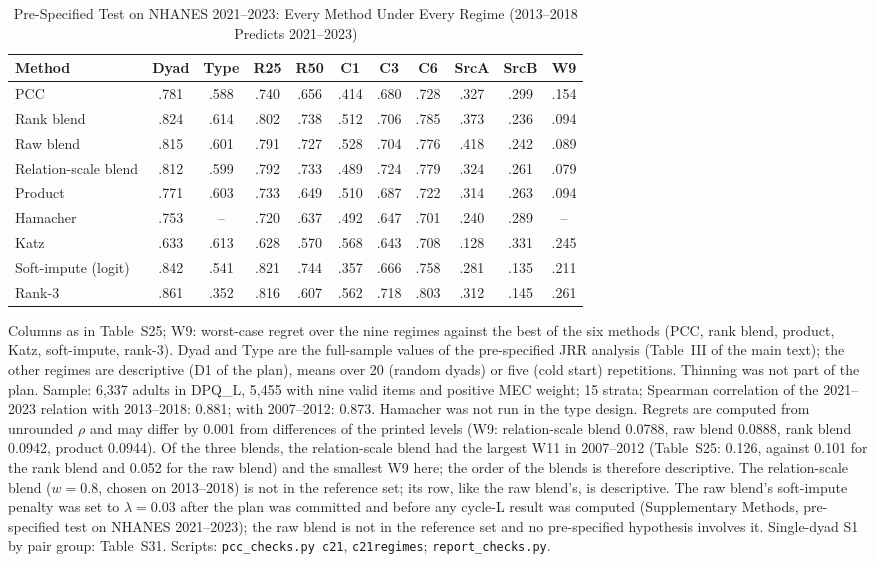 \documentclass[journal]{IEEEtran}
\begin{document}
\setcounter{table}{28}\begin{table}[!t]
\caption{Pre-Specified Test on NHANES 2021--2023: Every Method Under Every Regime (2013--2018 Predicts 2021--2023)}
\centering\scriptsize
\setlength{\tabcolsep}{3pt}
\begin{tabular}{@{}l c c c c c c c c c c@{}}
\toprule
Method & Dyad & Type & R25 & R50 & C1 & C3 & C6 & SrcA & SrcB & W9\\
\midrule
PCC & .781 & .588 & .740 & .656 & .414 & .680 & .728 & .327 & .299 & .154\\
Rank blend & .824 & .614 & .802 & .738 & .512 & .706 & .785 & .373 & .236 & .094\\
Raw blend & .815 & .601 & .791 & .727 & .528 & .704 & .776 & .418 & .242 & .089\\
Relation-scale blend & .812 & .599 & .792 & .733 & .489 & .724 & .779 & .324 & .261 & .079\\
Product & .771 & .603 & .733 & .649 & .510 & .687 & .722 & .314 & .263 & .094\\
Hamacher & .753 & -- & .720 & .637 & .492 & .647 & .701 & .240 & .289 & --\\
Katz & .633 & .613 & .628 & .570 & .568 & .643 & .708 & .128 & .331 & .245\\
Soft-impute (logit) & .842 & .541 & .821 & .744 & .357 & .666 & .758 & .281 & .135 & .211\\
Rank-3 & .861 & .352 & .816 & .607 & .562 & .718 & .803 & .312 & .145 & .261\\
\bottomrule
\end{tabular}
\smallskip
\parbox{\textwidth}{\scriptsize Columns as in Table~S25; W9: worst-case regret over the nine regimes against the best of the six methods (PCC, rank blend, product, Katz, soft-impute, rank-3). Dyad and Type are the full-sample values of the pre-specified JRR analysis (Table~III of the main text); the other regimes are descriptive (D1 of the plan), means over 20 (random dyads) or five (cold start) repetitions. Thinning was not part of the plan. Sample: 6,337 adults in DPQ\_L, 5,455 with nine valid items and positive MEC weight; 15 strata; Spearman correlation of the 2021--2023 relation with 2013--2018: 0.881; with 2007--2012: 0.873. Hamacher was not run in the type design. Regrets are computed from unrounded $\rho$ and may differ by 0.001 from differences of the printed levels (W9: relation-scale blend 0.0788, raw blend 0.0888, rank blend 0.0942, product 0.0944). Of the three blends, the relation-scale blend had the largest W11 in 2007--2012 (Table~S25: 0.126, against 0.101 for the rank blend and 0.052 for the raw blend) and the smallest W9 here; the order of the blends is therefore descriptive. The relation-scale blend ($w=0.8$, chosen on 2013--2018) is not in the reference set; its row, like the raw blend's, is descriptive. The raw blend's soft-impute penalty was set to $\lambda=0.03$ after the plan was committed and before any cycle-L result was computed (Supplementary Methods, pre-specified test on NHANES 2021--2023); the raw blend is not in the reference set and no pre-specified hypothesis involves it. Single-dyad S1 by pair group: Table~S31. Scripts: \texttt{pcc\_checks.py c21}, \texttt{c21regimes}; \texttt{report\_checks.py}.}
\end{table}
\end{document}
